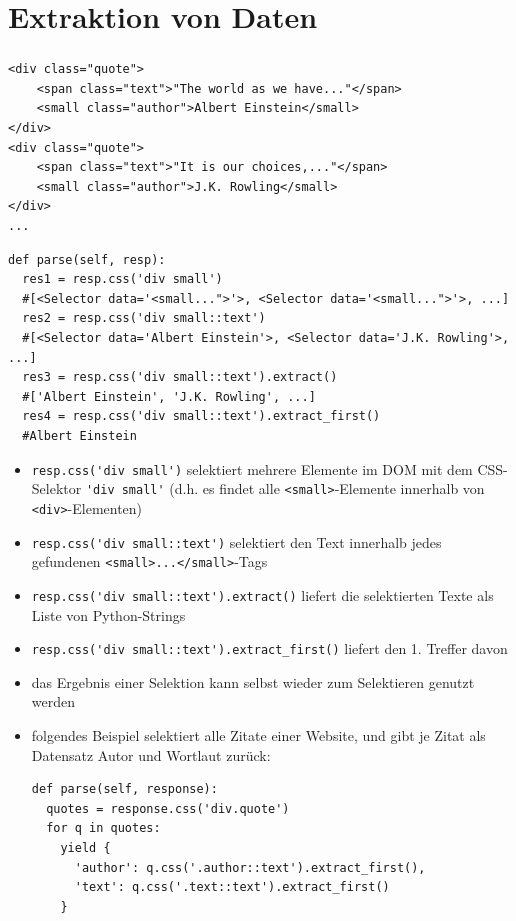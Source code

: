 \documentclass{beamer}
\begin{document}
\section{Extraktion von Daten}
\begin{frame}
	\frametitle{\insertsection{}}
	\begin{lstlisting}[basicstyle=\footnotesize]
<div class="quote">
    <span class="text">"The world as we have..."</span>
    <small class="author">Albert Einstein</small>
</div>
<div class="quote">
    <span class="text">"It is our choices,..."</span>
    <small class="author">J.K. Rowling</small>
</div>
...
	\end{lstlisting}
	\begin{lstlisting}[breaklines=true,basicstyle=\footnotesize]
def parse(self, resp):
  res1 = resp.css('div small')
  #[<Selector data='<small...">'>, <Selector data='<small...">'>, ...]
  res2 = resp.css('div small::text')
  #[<Selector data='Albert Einstein'>, <Selector data='J.K. Rowling'>, ...]
  res3 = resp.css('div small::text').extract()
  #['Albert Einstein', 'J.K. Rowling', ...]
  res4 = resp.css('div small::text').extract_first()
  #Albert Einstein
	\end{lstlisting}
	

	
	\framebreak
	
	\begin{itemize}
		\item \lstinline|resp.css('div small')| selektiert mehrere Elemente im DOM
		mit dem CSS-Selektor \lstinline|'div small'| (d.h. es findet alle \lstinline|<small>|-Elemente innerhalb von \lstinline|<div>|-Elementen)
		\item \lstinline|resp.css('div small::text')| selektiert den Text innerhalb jedes gefundenen \lstinline|<small>...</small>|-Tags
		\item \lstinline|resp.css('div small::text').extract()| liefert die selektierten Texte als Liste von Python-Strings
		\item \lstinline|resp.css('div small::text').extract_first()| liefert den 1. Treffer davon
	\end{itemize}
	
	\framebreak
	
	\begin{itemize}
		\item das Ergebnis einer Selektion kann selbst wieder zum Selektieren genutzt werden
		\item folgendes Beispiel selektiert alle Zitate einer Website, und gibt je Zitat als Datensatz Autor und Wortlaut zurück:
	\begin{lstlisting}
def parse(self, response):
  quotes = response.css('div.quote')
  for q in quotes:
    yield {
      'author': q.css('.author::text').extract_first(),
      'text': q.css('.text::text').extract_first()
    }
	\end{lstlisting}
	\end{itemize}
\end{frame}
\end{document}
